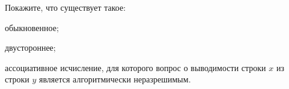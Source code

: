 Покажите, что существует такое:
\begin{enumcyr}
    \item обыкновенное;
    \item двустороннее;
\end{enumcyr}
ассоциативное исчисление, для которого вопрос о выводимости строки $x$ из строки $y$ является алгоритмически неразрешимым.